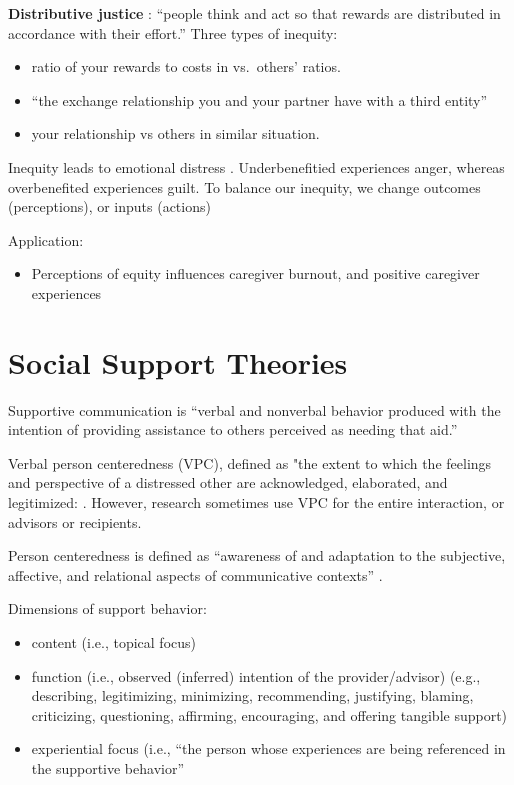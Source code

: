 \documentclass[
]{book}
\providecommand{\tightlist}{%
  \setlength{\itemsep}{0pt}\setlength{\parskip}{0pt}}
\begin{document}
\textbf{Distributive justice} \citep{Adams_1965}: ``people think and act so that rewards are distributed in accordance with their effort.'' Three types of inequity:

\begin{itemize}
\tightlist
\item
  ratio of your rewards to costs in vs.~others' ratios.\\
\item
  ``the exchange relationship you and your partner have with a third entity''\\
\item
  your relationship vs others in similar situation.
\end{itemize}

Inequity leads to emotional distress \citep{Sprecher_2001}. Underbenefitied experiences anger, whereas overbenefited experiences guilt. To balance our inequity, we change outcomes (perceptions), or inputs (actions)

Application:

\begin{itemize}
\tightlist
\item
  Perceptions of equity influences caregiver burnout, and positive caregiver experiences \citep{Ybema_2002}
\end{itemize}

\hypertarget{social-support-theories}{%
\section{Social Support Theories}\label{social-support-theories}}

Supportive communication is ``verbal and nonverbal behavior produced with the intention of providing assistance to others perceived as needing that aid.'' \citep[pp.317]{MacGeorge_2011}

Verbal person centeredness (VPC), defined as "the extent to which the feelings and perspective of a distressed other are acknowledged, elaborated, and legitimized: \citep{MacGeorge_2018}. However, research sometimes use VPC for the entire interaction, or advisors or recipients.

Person centeredness is defined as ``awareness of and adaptation to the subjective, affective, and relational aspects of communicative contexts'' \citep[pp.~249]{burleson_1998}.

Dimensions of support behavior:

\begin{itemize}
\item
  content (i.e., topical focus)
\item
  function (i.e., observed (inferred) intention of the provider/advisor) (e.g., describing, legitimizing, minimizing, recommending, justifying, blaming, criticizing, questioning, affirming, encouraging, and offering tangible support)
\item
  experiential focus (i.e., ``the person whose experiences are being referenced in the supportive behavior'' \citep[pp.~153]{MacGeorge_2018}
\end{itemize}
\end{document}
